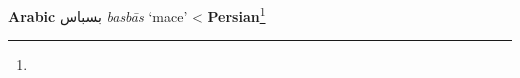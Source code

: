 \begin{etymology}\label{ety:basbas}
\textbf{Arabic} {بسباس} \textit{basbās} `mace'
< \textbf{Persian}\footnote{}
\end{etymology}
